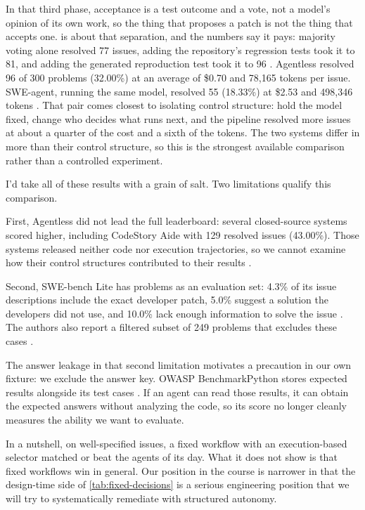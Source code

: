 In that third phase, acceptance is a test outcome and a vote, not a model's opinion of its own
work, so the thing that proposes a patch is not the thing that accepts one.  
is about that separation, and the numbers say it pays: majority voting alone resolved 77 issues, 
adding the repository's regression tests took it to 81, and adding the generated reproduction test 
took it to 96 \citep[\S5.2.3]{xia2025agentless}.
Agentless resolved 96 of 300 problems (32.00\%) at an average of \$0.70 and 78,165 tokens per
issue. SWE-agent, running the same model, resolved 55 (18.33\%) at \$2.53 and 498,346 tokens
\citep[Table~1]{xia2025agentless}. That pair comes closest to isolating control structure: hold
the model fixed, change who decides what runs next, and the pipeline resolved more issues at about
a quarter of the cost and a sixth of the tokens. The two systems differ in more than their control
structure, so this is the strongest available comparison rather than a controlled experiment.


I'd take all of these results with a grain of salt. Two limitations qualify this comparison. 

\bi
  \item First, Agentless did not lead the full leaderboard:
several closed-source systems scored higher, including CodeStory Aide with 129 resolved issues
(43.00\%). Those systems released neither code nor execution trajectories, so we cannot examine
how their control structures contributed to their results \citep[Table~1]{xia2025agentless}.
  \item Second, SWE-bench Lite has problems as an evaluation set: 4.3\% of its issue descriptions include
the exact developer patch, 5.0\% suggest a solution the developers did not use, and 10.0\% lack
enough information to solve the issue \citep[\S6.1]{xia2025agentless}. The authors also report a
filtered subset of 249 problems that excludes these cases \citep[\S6.2]{xia2025agentless}.
\ei

The answer leakage in that second limitation motivates a precaution in our own fixture: we
exclude the answer key. OWASP BenchmarkPython stores expected results alongside its test cases
\citep{owasp-benchmarkpython}. If an agent can read those results, it can obtain the expected
answers without analyzing the code, so its score no longer cleanly measures the ability we want
to evaluate.

In a nutshell, on well-specified issues, a fixed workflow with an execution-based selector matched or
beat the agents of its day. What it does not show is that fixed workflows win in general. 
Our position in the course is narrower in that the design-time side of \cref{tab:fixed-decisions} 
is a serious engineering position that we will try to systematically remediate with structured autonomy.

